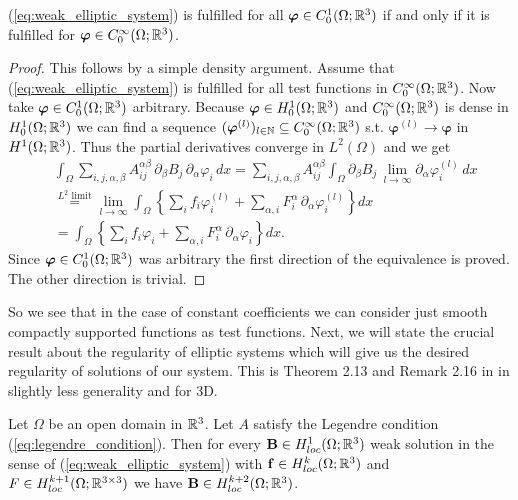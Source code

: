 \documentclass[../master_thesis.tex]{subfiles}
\begin{document}
\begin{proposition}\label{prop:weak_solution_smooth_test_functions}
    (\ref{eq:weak_elliptic_system}) is fulfilled for all 
    $\bm{\varphi} \in C^1_0(\Omega;\mathbb{R}^3)$ if and only if it is fulfilled 
    for $\bm{\varphi} \in C^\infty_0(\Omega;\mathbb{R}^3)$.
\end{proposition}
\begin{proof}
    This follows by a simple density argument. Assume that 
    (\ref{eq:weak_elliptic_system}) is fulfilled for all test functions in 
    $C^\infty_0(\Omega;\mathbb{R}^3)$. Now take $\bm{\varphi} \in C^1_0(\Omega;\mathbb{R}^3)$
    arbitrary. Because $\bm{\varphi} \in H_0^1(\Omega;\mathbb{R}^3)$ and 
    $C^\infty_0(\Omega;\mathbb{R}^3)$ is dense in $H_0^1(\Omega;\mathbb{R}^3)$ we can find 
    a sequence $(\bm{\varphi}^{(l)})_{l \in \mathbb{N}} \subseteq 
    C^\infty_0(\Omega;\mathbb{R}^3)$ s.t. $\bm{\varphi}^{(l)} \rightarrow \bm{\varphi}$
    in $H^1(\Omega;\mathbb{R}^3)$. Thus the partial derivatives converge in $L^2(\Omega)$
    and we get
    \begin{align*}
        &\int_\Omega \sum\limits_{i,j,\alpha,\beta} 
            A_{ij}^{\alpha \beta}\, \partial_\beta B_j\, \partial_\alpha \varphi_i
            \,dx
        = \sum\limits_{i,j,\alpha,\beta} A_{ij}^{\alpha \beta}
            \int_\Omega \partial_\beta B_j \, \lim\limits_{l\rightarrow \infty} 
            \partial_\alpha \varphi_i^{(l)}\, dx
        \\ &\stackrel{\text{$L^2$ limit}}{=} 
            \lim\limits_{l\rightarrow \infty} 
            \int_\Omega \left\{ \sum\limits_i f_i \varphi^{(l)}_i + 
            \sum\limits_{\alpha,i} F_i^\alpha \, \partial_\alpha \varphi^{(l)}_i 
            \right\} dx
        \\ &= \int_\Omega \left\{ \sum\limits_i f_i \varphi_i + 
            \sum\limits_{\alpha,i} F_i^\alpha \, \partial_\alpha \varphi_i 
            \right\} dx.
    \end{align*}
    Since $\bm{\varphi} \in C_0^1(\Omega;\mathbb{R}^3)$ was arbitrary the first 
    direction of the equivalence is proved. The other direction is trivial.
\end{proof}
So we see that in the case of constant coefficients we can consider 
just smooth compactly supported functions as test functions.
Next, we will state the crucial result about the regularity of elliptic systems
which will give us the desired regularity of solutions of our system. This is Theorem 2.13 and Remark 2.16 
in \cite{lectures_on_elliptic_pdes} in slightly less generality and for 3D.
\begin{theorem}\label{thm:regularity_elliptic_systems}
    Let $\Omega$ be an open domain in $\mathbb{R}^3$. Let $A$ 
    satisfy the Legendre condition (\ref{eq:legendre_condition}). Then for every 
    $\mathbf{B} \in H^1_{loc}(\Omega;\mathbb{R}^3)$ weak solution in the sense of
    (\ref{eq:weak_elliptic_system}) with $\mathbf{f} \in H^k_{loc}(\Omega;\mathbb{R}^3)$ and 
    $F \in H^{k+1}_{loc}(\Omega;\mathbb{R}^{3\times 3})$ 
    we have $\mathbf{B} \in H^{k+2}_{loc}(\Omega;\mathbb{R}^3)$. 
\end{theorem}
\end{document}
